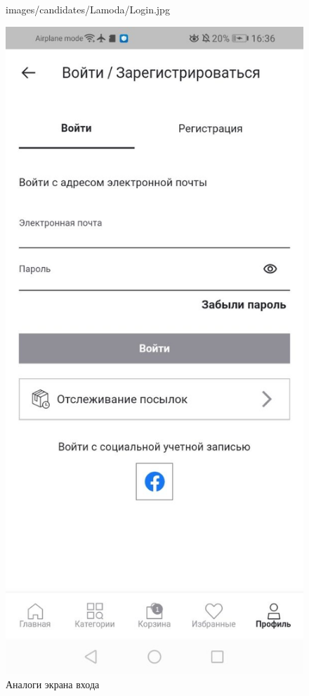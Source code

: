 \begin{figure}[!p]
\begin{minipage}{0.16\textwidth}
    {images/candidates/Lamoda/Login.jpg}
  \end{minipage}
  \begin{minipage}{0.16\textwidth}
    \includegraphics[width=.99\linewidth]
    {images/candidates/DeFacto/Login.jpg}
  \end{minipage}

  \caption{Аналоги экрана входа}\label{fig:analyzLogin}
\end{figure}

